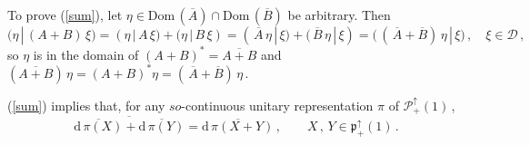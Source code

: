 \documentclass[reqno]{amsart}
\theoremstyle{definition}
\theoremstyle{remark}
\numberwithin{equation}{section}
\theoremstyle{plain}
\begin{document}
To prove (\ref{sum}), let $\eta\in\text{Dom}\, (\overline{A})
\cap\text{Dom}\, (\overline{B})$ be arbitrary. Then
\begin{equation*}
\big(\eta\, |\, (A+B)\,\xi\big) =(\eta\, |\, A\,\xi )+
(\eta\, |\, B\,\xi )=
(\,\overline{A}\,\eta\, |\,\xi )+
(\,\overline{B}\,\eta\, |\,\xi )=\big(\, (\,\overline{A} +
\overline{B})\,\eta\, |\,\xi\big)\, ,\quad \xi\in\mathcal D\, ,
\end{equation*}
so $\eta$ is in the domain of $(A+B)^* =\overline{A+B}$
and $(\overline{A+B})\,\eta =(A+B)^*\eta =(\,\overline{A} +
\overline{B})\,\eta\,$.

(\ref{sum}) implies that, for any $so$-continuous unitary
representation $\pi$ of $\mathcal P_+^\uparrow (1)\,$,
\begin{equation}\label{sumLie}
\overline{\overline{\text{d}\,\pi (X)} +
\overline{\text{d}\,\pi (Y)}} =\overline{\text{d}\,
\pi (X+Y)}\, ,\qquad X\, ,\, Y\in\mathfrak p_+^\uparrow (1)\, .
\end{equation}
\end{document}
